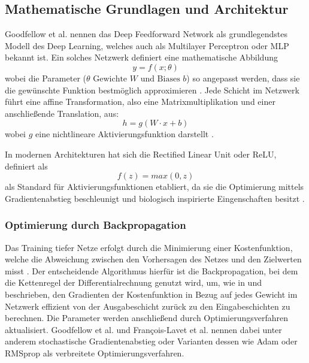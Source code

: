 \subsection{Mathematische  Grundlagen und Architektur}
Goodfellow et al. \cite{Goodfellow-et-al-2016} nennen das Deep Feedforward Network als grundlegendstes Modell des Deep Learning, welches auch als Multilayer Perceptron oder MLP bekannt ist. Ein solches Netzwerk definiert eine mathematische Abbildung 
\begin{equation}
	y = f(x; \theta)
\end{equation}
wobei die Parameter ($\theta \text{ Gewichte } W \text{ und Biases } b$) so angepasst werden, dass sie die gewünschte Funktion bestmöglich approximieren \cite{Goodfellow-et-al-2016, francois-lavetIntroductionDeepReinforcement2018}. Jede Schicht im Netzwerk führt eine affine Transformation, also eine Matrixmultiplikation und einer anschließende Translation, aus:
\begin{equation}
	h = g(W\cdot x + b)
\end{equation}
wobei $g$ eine nichtlineare Aktivierungsfunktion darstellt \cite{Goodfellow-et-al-2016}.

In modernen Architekturen hat sich die Rectified Linear Unit oder ReLU, definiert als 
\begin{equation}
	f(z) = max(0, z)
\end{equation}
als Standard für Aktivierungsfunktionen etabliert, da sie die Optimierung mittels Gradientenabstieg beschleunigt und biologisch inspirierte Eingenschaften besitzt \cite{Goodfellow-et-al-2016}. 
\subsubsection{Optimierung durch Backpropagation}
Das Training tiefer Netze erfolgt durch die Minimierung einer Kostenfunktion, welche die Abweichung zwischen den Vorhersagen des Netzes und den Zielwerten misst \cite{Goodfellow-et-al-2016, francois-lavetIntroductionDeepReinforcement2018}. Der entscheidende Algorithmus hierfür ist die Backpropagation, bei dem die Kettenregel der Differentialrechnung genutzt wird, um, wie in \cite{Goodfellow-et-al-2016} und \cite{francois-lavetIntroductionDeepReinforcement2018} beschrieben, den Gradienten der Kostenfunktion in Bezug auf jedes Gewicht im Netzwerk effizient von der Ausgabeschicht zurück zu den Eingabeschichten zu berechnen.
Die Parameter werden anschließend durch Optimierungsverfahren aktualisiert. Goodfellow et al. \cite{Goodfellow-et-al-2016} und François-Lavet et al. \cite{francois-lavetIntroductionDeepReinforcement2018} nennen dabei unter anderem stochastische Gradientenabstieg oder Varianten dessen wie Adam oder RMSprop als verbreitete Optimierungsverfahren.
